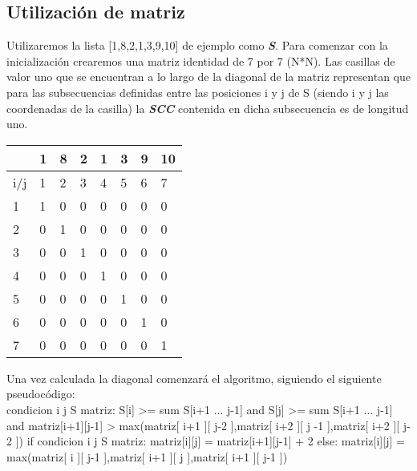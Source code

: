 \documentclass[10pt]{article}
\begin{document}
\subsection*{Utilizaci\'on de matriz}
Utilizaremos la lista [1,8,2,1,3,9,10] de ejemplo como \textbf{\textit{S}}.
 Para comenzar con la inicializaci\'on crearemos una matriz identidad de 7 por 7 (N*N).
Las casillas de valor uno que se encuentran a lo largo de la diagonal de la matriz representan que para las subsecuencias definidas entre las posiciones i y j de S (siendo i y j las coordenadas de la casilla) la \textbf{\textit{SCC}} contenida en dicha subsecuencia es de longitud uno.\\
\begin{table}[htbp]
\begin{center}
\begin{tabular}{|l|l|l|l|l|l|l|l|}
\hline
 & 1 & 8 & 2 & 1 & 3 & 9 & 10 \\ \hline
 i/j & 1 & 2 & 3 & 4 & 5 & 6 & 7 \\ \hline
 1 & 1 & 0 & 0 & 0 & 0 & 0 & 0 \\ \hline
 2 & 0 & 1 & 0 & 0 & 0 & 0 & 0 \\ \hline
 3 & 0 & 0 & 1 & 0 & 0 & 0 & 0 \\ \hline
 4 & 0 & 0 & 0 & 1 & 0 & 0 & 0 \\ \hline
 5 & 0 & 0 & 0 & 0 & 1 & 0 & 0 \\ \hline
 6 & 0 & 0 & 0 & 0 & 0 & 1 & 0 \\ \hline
 7 & 0 & 0 & 0 & 0 & 0 & 0 & 1 \\ \hline
\end{tabular}
\end{center}
\end{table}
\newpage
Una vez calculada la diagonal comenzar\'a el algoritmo, siguiendo el siguiente pseudoc\'odigo:\\

condicion i j S matriz:
\newline
S[i] >= sum S[i+1 ... j-1] and S[j] >= sum S[i+1 ... j-1] and  matriz[i+1][j-1] > max(matriz[ i+1 ][ j-2 ],matriz[ i+2 ][ j -1 ],matriz[ i+2 ][ j-2 ])
\newline
if condicion i j S matriz:
\newline
		\hspace{3cm} matriz[i][j] = matriz[i+1][j-1] + 2
		\newline
	else:
	\newline
	\hspace{3cm} matriz[i][j] = max(matriz[ i ][ j-1 ],matriz[ i+1 ][ j ],matriz[ i+1 ][ j-1 ])
\newline
\end{document}
